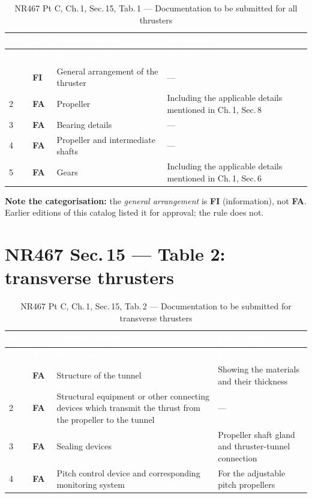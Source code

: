 \documentclass[11pt,a4paper]{report}
\newcommand{\fa}{\textbf{\textcolor{warningred}{FA}}}
\newcommand{\fic}{\textbf{\textcolor{bvgray}{FI}}}
\begin{document}
\begin{longtable}{|p{0.7cm}|p{1.1cm}|p{6.2cm}|p{6.0cm}|}
\caption{NR467 Pt C, Ch.\,1, Sec.\,15, Tab.\,1 --- Documentation to be submitted for all thrusters} \label{tab:s15t1} \\
\hline
\rowcolor{bvblue}
\textcolor{white}{\textbf{No.}} & \textcolor{white}{\textbf{A/I}} & \textcolor{white}{\textbf{Documentation}} & \textcolor{white}{\textbf{Particulars}} \\
\hline
\endfirsthead
\hline
\rowcolor{bvblue}
\textcolor{white}{\textbf{No.}} & \textcolor{white}{\textbf{A/I}} & \textcolor{white}{\textbf{Documentation}} & \textcolor{white}{\textbf{Particulars}} \\
\hline
\endhead
\hline
\endlastfoot
1 & \fic{} & General arrangement of the thruster & --- \\
\hline
2 & \fa{} & Propeller & Including the applicable details mentioned in Ch.\,1, Sec.\,8 \\
\hline
3 & \fa{} & Bearing details & --- \\
\hline
4 & \fa{} & Propeller and intermediate shafts & --- \\
\hline
5 & \fa{} & Gears & Including the applicable details mentioned in Ch.\,1, Sec.\,6 \\
\hline
\end{longtable}

\noindent\textbf{Note the categorisation:} the \emph{general arrangement} is
\fic{} (information), not \fa{}. Earlier editions of this catalog listed it for
approval; the rule does not.

\section{NR467 Sec.\,15 --- Table 2: transverse thrusters}

\begin{longtable}{|p{0.7cm}|p{1.1cm}|p{6.2cm}|p{6.0cm}|}
\caption{NR467 Pt C, Ch.\,1, Sec.\,15, Tab.\,2 --- Documentation to be submitted for transverse thrusters} \label{tab:s15t2} \\
\hline
\rowcolor{bvblue}
\textcolor{white}{\textbf{No.}} & \textcolor{white}{\textbf{A/I}} & \textcolor{white}{\textbf{Documentation}} & \textcolor{white}{\textbf{Particulars}} \\
\hline
\endfirsthead
\hline
\rowcolor{bvblue}
\textcolor{white}{\textbf{No.}} & \textcolor{white}{\textbf{A/I}} & \textcolor{white}{\textbf{Documentation}} & \textcolor{white}{\textbf{Particulars}} \\
\hline
\endhead
\hline
\endlastfoot
1 & \fa{} & Structure of the tunnel & Showing the materials and their thickness \\
\hline
2 & \fa{} & Structural equipment or other connecting devices which transmit the thrust from the propeller to the tunnel & --- \\
\hline
3 & \fa{} & Sealing devices & Propeller shaft gland and thruster-tunnel connection \\
\hline
4 & \fa{} & Pitch control device and corresponding monitoring system & For the adjustable pitch propellers \\
\hline
\end{longtable}
\end{document}
